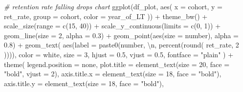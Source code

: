 \documentclass[
]{book}
\newenvironment{Shaded}{\begin{snugshade}}{\end{snugshade}}
\newcommand{\AttributeTok}[1]{\textcolor[rgb]{0.77,0.63,0.00}{#1}}
\newcommand{\CommentTok}[1]{\textcolor[rgb]{0.56,0.35,0.01}{\textit{#1}}}
\newcommand{\DecValTok}[1]{\textcolor[rgb]{0.00,0.00,0.81}{#1}}
\newcommand{\FloatTok}[1]{\textcolor[rgb]{0.00,0.00,0.81}{#1}}
\newcommand{\FunctionTok}[1]{\textcolor[rgb]{0.00,0.00,0.00}{#1}}
\newcommand{\NormalTok}[1]{#1}
\newcommand{\SpecialCharTok}[1]{\textcolor[rgb]{0.00,0.00,0.00}{#1}}
\newcommand{\StringTok}[1]{\textcolor[rgb]{0.31,0.60,0.02}{#1}}
\begin{document}
\begin{Shaded}
\begin{Highlighting}[]
\CommentTok{\# retention rate falling drops chart}
\FunctionTok{ggplot}\NormalTok{(df\_plot,}
       \FunctionTok{aes}\NormalTok{(}
           \AttributeTok{x =}\NormalTok{ cohort,}
           \AttributeTok{y =}\NormalTok{ ret\_rate,}
           \AttributeTok{group =}\NormalTok{ cohort,}
           \AttributeTok{color =}\NormalTok{ year\_of\_LT}
\NormalTok{       )) }\SpecialCharTok{+}
    \FunctionTok{theme\_bw}\NormalTok{() }\SpecialCharTok{+}
    \FunctionTok{scale\_size}\NormalTok{(}\AttributeTok{range =} \FunctionTok{c}\NormalTok{(}\DecValTok{15}\NormalTok{, }\DecValTok{40}\NormalTok{)) }\SpecialCharTok{+}
    \FunctionTok{scale\_y\_continuous}\NormalTok{(}\AttributeTok{limits =} \FunctionTok{c}\NormalTok{(}\DecValTok{0}\NormalTok{, }\DecValTok{1}\NormalTok{)) }\SpecialCharTok{+}
    \FunctionTok{geom\_line}\NormalTok{(}\AttributeTok{size =} \DecValTok{2}\NormalTok{, }\AttributeTok{alpha =} \FloatTok{0.3}\NormalTok{) }\SpecialCharTok{+}
    \FunctionTok{geom\_point}\NormalTok{(}\FunctionTok{aes}\NormalTok{(}\AttributeTok{size =}\NormalTok{ number), }\AttributeTok{alpha =} \FloatTok{0.8}\NormalTok{) }\SpecialCharTok{+}
    \FunctionTok{geom\_text}\NormalTok{(}
        \FunctionTok{aes}\NormalTok{(}\AttributeTok{label =} \FunctionTok{paste0}\NormalTok{(number, }\StringTok{\textquotesingle{}}\SpecialCharTok{\textbackslash{}n}\StringTok{\textquotesingle{}}\NormalTok{, }\FunctionTok{percent}\NormalTok{(}\FunctionTok{round}\NormalTok{(}
\NormalTok{            ret\_rate, }\DecValTok{2}
\NormalTok{        )))),}
        \AttributeTok{color =} \StringTok{\textquotesingle{}white\textquotesingle{}}\NormalTok{,}
        \AttributeTok{size =} \DecValTok{3}\NormalTok{,}
        \AttributeTok{hjust =} \FloatTok{0.5}\NormalTok{,}
        \AttributeTok{vjust =} \FloatTok{0.5}\NormalTok{,}
        \AttributeTok{fontface =} \StringTok{"plain"}
\NormalTok{    ) }\SpecialCharTok{+}
    \FunctionTok{theme}\NormalTok{(}
        \AttributeTok{legend.position =} \StringTok{\textquotesingle{}none\textquotesingle{}}\NormalTok{,}
        \AttributeTok{plot.title =} \FunctionTok{element\_text}\NormalTok{(}\AttributeTok{size =} \DecValTok{20}\NormalTok{, }\AttributeTok{face =} \StringTok{"bold"}\NormalTok{, }\AttributeTok{vjust =} \DecValTok{2}\NormalTok{),}
        \AttributeTok{axis.title.x =} \FunctionTok{element\_text}\NormalTok{(}\AttributeTok{size =} \DecValTok{18}\NormalTok{, }\AttributeTok{face =} \StringTok{"bold"}\NormalTok{),}
        \AttributeTok{axis.title.y =} \FunctionTok{element\_text}\NormalTok{(}\AttributeTok{size =} \DecValTok{18}\NormalTok{, }\AttributeTok{face =} \StringTok{"bold"}\NormalTok{),}

\end{Highlighting}
\end{Shaded}
\end{document}
